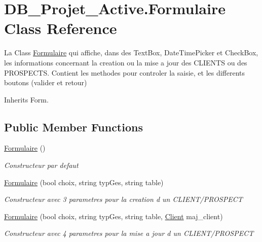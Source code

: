 \hypertarget{class_d_b___projet___active_1_1_formulaire}{}\section{D\+B\+\_\+\+Projet\+\_\+\+Active.\+Formulaire Class Reference}
\label{class_d_b___projet___active_1_1_formulaire}


La Class \mbox{\hyperlink{class_d_b___projet___active_1_1_formulaire}{Formulaire}} qui affiche, dans des Text\+Box, Date\+Time\+Picker et Check\+Box, les informations concernant la creation ou la mise a jour des C\+L\+I\+E\+N\+TS ou des P\+R\+O\+S\+P\+E\+C\+TS. Contient les methodes pour controler la saisie, et les differents boutons (valider et retour)  




Inherits Form.

\subsection*{Public Member Functions}
\begin{DoxyCompactItemize}
\item 
\mbox{\hyperlink{class_d_b___projet___active_1_1_formulaire_aac72bda1b5ee68ba804b82fd03903d12}{Formulaire}} ()
\begin{DoxyCompactList}\small\item\em Constructeur par defaut \end{DoxyCompactList}\item 
\mbox{\hyperlink{class_d_b___projet___active_1_1_formulaire_a8117462a103b6eb79d5cd91beb5de732}{Formulaire}} (bool choix, string typ\+Ges, string table)
\begin{DoxyCompactList}\small\item\em Constructeur avec 3 parametres pour la creation d un C\+L\+I\+E\+N\+T/\+P\+R\+O\+S\+P\+E\+CT \end{DoxyCompactList}\item 
\mbox{\hyperlink{class_d_b___projet___active_1_1_formulaire_acd44a08fece56c83e3dd6f2a4d3fd75e}{Formulaire}} (bool choix, string typ\+Ges, string table, \mbox{\hyperlink{class_d_b___projet___active_1_1_client}{Client}} maj\+\_\+client)
\begin{DoxyCompactList}\small\item\em Constructeur avec 4 parametres pour la mise a jour d un C\+L\+I\+E\+N\+T/\+P\+R\+O\+S\+P\+E\+CT \end{DoxyCompactList}\end{DoxyCompactItemize}
